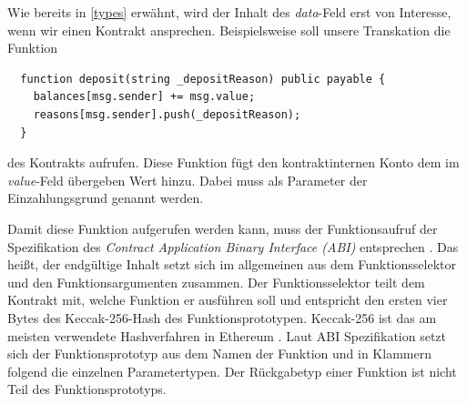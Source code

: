 \documentclass[runningheads]{llncs}
\begin{document}
Wie bereits in \ref{types} erwähnt, wird der Inhalt des \textit{data}-Feld erst von Interesse, wenn wir einen Kontrakt ansprechen.
Beispielsweise soll unsere Transkation die Funktion \\
\begin{verbatim}
  function deposit(string _depositReason) public payable {
    balances[msg.sender] += msg.value;
    reasons[msg.sender].push(_depositReason);
  }
\end{verbatim}
des Kontrakts aufrufen. Diese Funktion fügt den kontraktinternen Konto dem im \textit{value}-Feld übergeben Wert hinzu. Dabei muss als Parameter der Einzahlungsgrund genannt werden.

Damit diese Funktion aufgerufen werden kann, muss der Funktionsaufruf der Spezifikation des \textit{Contract Application Binary Interface (ABI)} entsprechen \cite{noauthor_contract_nodate}.
Das heißt, der endgültige Inhalt setzt sich im allgemeinen aus dem Funktionsselektor und den Funktionsargumenten zusammen. Der Funktionsselektor teilt dem Kontrakt mit, welche Funktion er ausführen soll und entspricht den ersten vier Bytes des Keccak-256-Hash des Funktionsprototypen. Keccak-256 ist das am meisten verwendete Hashverfahren in Ethereum \cite[S. 3]{wood_ethereum/yellowpaper_2019}. Laut ABI Spezifikation setzt sich der Funktionsprototyp aus dem Namen der Funktion und in Klammern folgend die einzelnen Parametertypen. Der Rückgabetyp einer Funktion ist nicht Teil des Funktionsprototyps.
\end{document}

